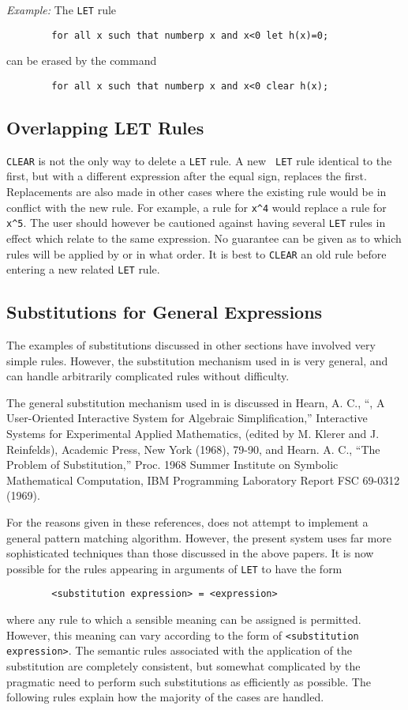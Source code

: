 {\it Example:} The {\tt LET} rule
\begin{verbatim}
        for all x such that numberp x and x<0 let h(x)=0;
\end{verbatim}
can be erased by the command
\begin{verbatim}
        for all x such that numberp x and x<0 clear h(x);
\end{verbatim}

\subsection{Overlapping LET Rules}
{\tt CLEAR} is not the only way to delete a {\tt LET} rule.  A new {\tt
LET} rule identical to the first, but with a different expression after
the equal sign, replaces the first.  Replacements are also made in other
cases where the existing rule would be in conflict with the new rule.  For
example, a rule for {\tt x\^{ }4} would replace a rule for {\tt x\^{ }5}.
The user should however be cautioned against having several {\tt LET}
rules in effect which relate to the same expression.  No guarantee can be
given as to which rules will be applied by {\REDUCE} or in what order.  It
is best to {\tt CLEAR} an old rule before entering a new related {\tt LET}
rule.

\subsection{Substitutions for General Expressions}
\label{sec-gensubs}
The examples of substitutions discussed in other sections have involved
very simple rules. However, the substitution mechanism used in {\REDUCE} is
very general, and can handle arbitrarily complicated rules without
difficulty.

The general substitution mechanism used in {\REDUCE} is discussed in Hearn, A.
C., ``{\REDUCE}, A User-Oriented Interactive System for Algebraic
Simplification,'' Interactive Systems for Experimental Applied Mathematics,
(edited by M. Klerer and J. Reinfelds), Academic Press, New York (1968),
79-90, and Hearn. A. C., ``The Problem of Substitution,'' Proc. 1968 Summer
Institute on Symbolic Mathematical Computation, IBM Programming Laboratory
Report FSC 69-0312 (1969).

For the reasons given in these references, {\REDUCE} does not attempt to
implement a general pattern matching algorithm. However, the present
system uses far more sophisticated techniques than those discussed in the
above papers. It is now possible for the rules appearing in arguments of
{\tt LET} to have the form
\begin{verbatim}
        <substitution expression> = <expression>
\end{verbatim}
where any rule to which a sensible meaning can be assigned is permitted.
However, this meaning can vary according to the form of {\tt <substitution
expression>}. The semantic rules associated with the application of the
substitution are completely consistent, but somewhat complicated by the
pragmatic need to perform such substitutions as efficiently as possible.
The following rules explain how the majority of the cases are handled.

